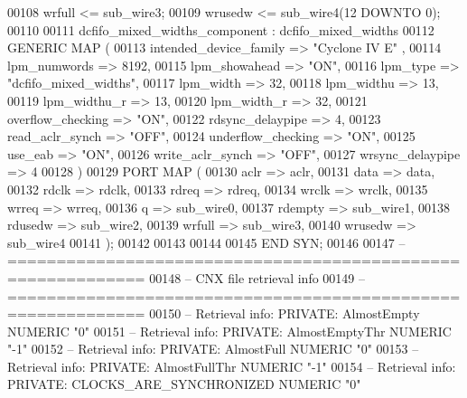 \begin{DoxyCode}
{00108     \textcolor{vhdlchar}{wrfull}    \textcolor{vhdlchar}{<=} \textcolor{vhdlchar}{sub_wire3};
00109     \textcolor{vhdlchar}{wrusedw}    \textcolor{vhdlchar}{<=} \textcolor{vhdlchar}{sub_wire4}\textcolor{vhdlchar}{(}\textcolor{vhdllogic}{}\textcolor{vhdllogic}{12} \textcolor{keywordflow}{DOWNTO} \textcolor{vhdllogic}{}\textcolor{vhdllogic}{0}\textcolor{vhdlchar}{)};
00110 
00111     dcfifo_mixed_widths_component : dcfifo\_mixed\_widths
00112     \textcolor{keywordflow}{GENERIC} \textcolor{keywordflow}{MAP} (
00113         intended\_device\_family => \textcolor{keyword}{"Cyclone IV E"}  ,
00114         lpm\_numwords => \textcolor{vhdllogic}{8192},
00115         lpm\_showahead => \textcolor{keyword}{"ON"},
00116         lpm\_type => \textcolor{keyword}{"dcfifo\_mixed\_widths"},
00117         lpm\_width => \textcolor{vhdllogic}{32},
00118         lpm\_widthu => \textcolor{vhdllogic}{13},
00119         lpm\_widthu\_r => \textcolor{vhdllogic}{13},
00120         lpm\_width\_r => \textcolor{vhdllogic}{32},
00121         overflow\_checking => \textcolor{keyword}{"ON"},
00122         rdsync\_delaypipe => \textcolor{vhdllogic}{4},
00123         read\_aclr\_synch => \textcolor{keyword}{"OFF"},
00124         underflow\_checking => \textcolor{keyword}{"ON"},
00125         use\_eab => \textcolor{keyword}{"ON"},
00126         write\_aclr\_synch => \textcolor{keyword}{"OFF"},
00127         wrsync\_delaypipe => \textcolor{vhdllogic}{4}
00128     \textcolor{vhdlchar}{)}
00129     \textcolor{keywordflow}{PORT} \textcolor{keywordflow}{MAP} (
00130         aclr => aclr,
00131         data => data,
00132         rdclk => rdclk,
00133         rdreq => rdreq,
00134         wrclk => wrclk,
00135         wrreq => wrreq,
00136         q => sub_wire0,
00137         rdempty => sub_wire1,
00138         rdusedw => sub_wire2,
00139         wrfull => sub_wire3,
00140         wrusedw => sub_wire4
00141     \textcolor{vhdlchar}{)};
00142 
00143 
00144 
00145 \textcolor{keywordflow}{END} \textcolor{vhdlchar}{SYN};
00146 
00147 \textcolor{keyword}{-- ============================================================}
00148 \textcolor{keyword}{-- CNX file retrieval info}
00149 \textcolor{keyword}{-- ============================================================}
00150 \textcolor{keyword}{-- Retrieval info: PRIVATE: AlmostEmpty NUMERIC "0"}
00151 \textcolor{keyword}{-- Retrieval info: PRIVATE: AlmostEmptyThr NUMERIC "-1"}
00152 \textcolor{keyword}{-- Retrieval info: PRIVATE: AlmostFull NUMERIC "0"}
00153 \textcolor{keyword}{-- Retrieval info: PRIVATE: AlmostFullThr NUMERIC "-1"}
00154 \textcolor{keyword}{-- Retrieval info: PRIVATE: CLOCKS\_ARE\_SYNCHRONIZED NUMERIC "0"}
}
\end{DoxyCode}
